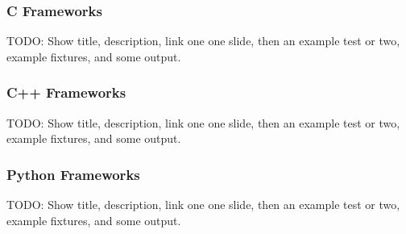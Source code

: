 \begin{frame}
  \frametitle{C Frameworks}
  TODO: Show title, description, link one one slide, then
  an example test or two, example fixtures, and some output.
\end{frame}

\begin{frame}
  \frametitle{C++ Frameworks}
  TODO: Show title, description, link one one slide, then
  an example test or two, example fixtures, and some output.
\end{frame}

\begin{frame}
  \frametitle{Python Frameworks}
  TODO: Show title, description, link one one slide, then
  an example test or two, example fixtures, and some output.
\end{frame}
